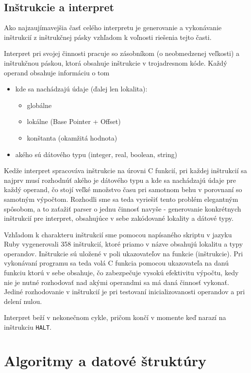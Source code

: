 \documentclass[12pt,a4paper,titlepage,final]{article}
\begin{document}
\subsection{Inštrukcie a interpret}
Ako najzaujímavejšia časť celého interpretu je generovanie a vykonávanie inštrukcií
z inštrukčnej pásky vzhľadom k voľnosti riešenia tejto časti.

Interpret pri svojej činnosti pracuje so zásobníkom (o neobmedzenej veľkosti) a
inštrukčnou páskou, ktorá obsahuje inštrukcie v trojadresnom kóde.
Každý operand obsahuje informáciu o tom 
\begin{itemize}
	\item kde sa nachádzajú údaje (ďalej len lokalita):
		\begin{itemize}
			\item globálne
			\item lokálne (Base Pointer + Offset)
			\item konštanta (okamžitá hodnota)
		\end{itemize}
	\item akého sú dátového typu (integer, real, boolean, string)
\end{itemize}

Kedže interpret spracováva inštrukcie na úrovni C funkcií, pri každej inštrukcií
 sa najprv musí rozhodnúť akého je dátového typu a kde sa nachádzajú údaje pre 
 každý operand, čo stojí veľké množstvo času pri samotnom behu v porovnaní 
 so samotným výpočtom.
Rozhodli sme sa teda vyriešiť tento problém elegantným spôsobom, 
 a to zaťažiť parser o jednu činnosť navyše - generovanie konkrétnych 
 inštrukcií pre interpret, obsahujúce v sebe zakódované lokality a dátové typy.

Vzhľadom k charakteru inštrukcií sme pomocou napísaného skriptu v jazyku Ruby
 vygenerovali 358 inštrukcií, 
 ktoré priamo v názve obsahujú lokalitu a typy operandov.
Inštrukcie sú uložené v poli ukazovateľov na funkcie (inštrukcie).
 Pri vykonávaní programu sa teda volá C funkcia pomocou ukazovateľa na danú 
 funkciu ktorú v sebe obsahuje, čo zabezpečuje vysokú efektivitu výpočtu,
 kedy nie je nutné rozhodovať nad akými operandmi sa má daná činnosť vykonať.
 Jediné rozhodovanie v inštrukcií je pri testovaní inicializovanosti operandov a pri delení nulou.

Interpret beží v nekonečnom cykle, pričom končí v momente keď narazí na inštrukciu
\texttt{HALT}.

\section{Algoritmy a datové štruktúry}
\end{document}
